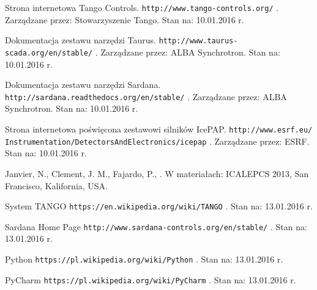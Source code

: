 \clearpage

\begin{thebibliography}{99} %

Strona internetowa Tango Controls.
\newblock \texttt{http://www.tango-controls.org/} .
\newblock Zarządzane przez: Stowarzyszenie Tango.
\newblock Stan na: 10.01.2016 r.

Dokumentacja zestawu narzędzi Taurus.
\newblock \texttt{http://www.taurus-scada.org/en/stable/} .
\newblock Zarządzane przez: ALBA Synchrotron.
\newblock Stan na: 10.01.2016 r.

Dokumentacja zestawu narzędzi Sardana.
\newblock \texttt{http://sardana.readthedocs.org/en/stable/} .
\newblock Zarządzane przez: ALBA Synchrotron.
\newblock Stan na: 10.01.2016 r.

Strona internetowa poświęcona zestawowi silników IcePAP.
\newblock \texttt{http://www.esrf.eu/\\Instrumentation/DetectorsAndElectronics/icepap} .
\newblock Zarządzane przez: ESRF.
\newblock Stan na: 10.01.2016 r.

Janvier, N., Clement, J. M., Fajardo, P.,  
.
\newblock W materiałach: ICALEPCS 2013, San Francisco, Kalifornia, USA.

System TANGO
\newblock \texttt{https://en.wikipedia.org/wiki/TANGO} .
\newblock Stan na: 13.01.2016 r.

Sardana Home Page
\newblock \texttt{http://www.sardana-controls.org/en/stable/} .
\newblock Stan na: 13.01.2016 r.

Python
\newblock \texttt{https://pl.wikipedia.org/wiki/Python} .
\newblock Stan na: 13.01.2016 r.

PyCharm
\newblock \texttt{https://pl.wikipedia.org/wiki/PyCharm} .
\newblock Stan na: 13.01.2016 r.



\end{thebibliography}